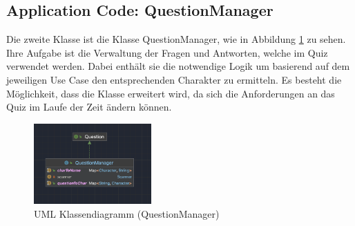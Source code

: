 \subsection{Application Code: QuestionManager}
Die zweite Klasse ist die Klasse QuestionManager, wie in Abbildung \ref{fig:QuestionManager} zu sehen. Ihre Aufgabe ist die Verwaltung der Fragen und Antworten, welche im Quiz verwendet werden. Dabei enthält sie die notwendige Logik um basierend auf dem jeweiligen Use Case den entsprechenden Charakter zu ermitteln. Es besteht die Möglichkeit, dass die Klasse erweitert wird, da sich die Anforderungen an das Quiz im Laufe der Zeit ändern können.
\begin{figure}[ht]
    \centering
    \includegraphics[width=0.4\textwidth]{Bilder/QM.png}
    \caption{UML Klassendiagramm (QuestionManager)}
    \label{fig:QuestionManager}
\end{figure}

